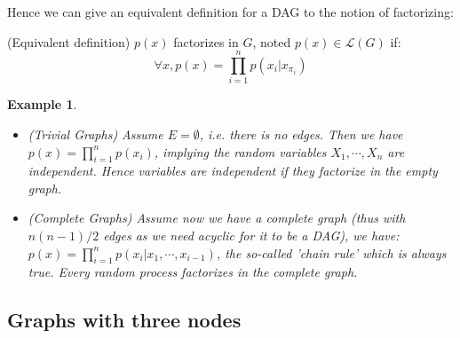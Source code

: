\documentclass[12pt]{report}
\newtheorem{example}{Example}[section]
\begin{document}
Hence we can give an equivalent definition for a DAG to the notion of factorizing: 

\begin{definition}
(Equivalent definition) $p(x)$ factorizes in $G$, noted $p(x)\in \mathcal{L}(G)$ if:
\begin{equation}
\forall x, p(x) = \prod_{i=1}^n p(x_i | x_{\pi_i})
\label{eq:}
\end{equation}
\end{definition}


\begin{example}
\begin{itemize}
	\item (Trivial Graphs) Assume $E = \emptyset$, \emph{i.e.} there is no edges. Then we have $p(x) = \prod_{i=1}^n p(x_i)$, implying the random variables $X_1, \cdots, X_n$ are independent. Hence variables are independent if they factorize in the empty graph. 
	\item (Complete Graphs) Assume now we have a complete graph (thus with $n(n-1)/2$ edges as we need acyclic for it to be a DAG), we have: $p(x) = \prod_{i=1}^n p(x_i | x_1, \cdots, x_{i-1})$, the so-called 'chain rule' which is always true. Every random process factorizes in the complete graph.
\end{itemize}
\end{example}



\subsection{Graphs with three nodes}
\end{document}
